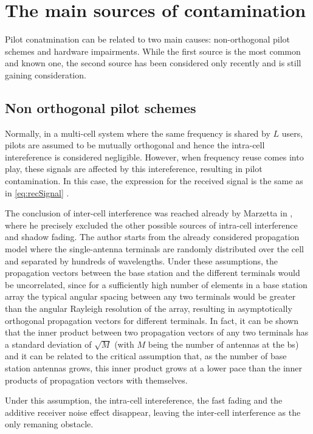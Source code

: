 \documentclass[11pt]{book}
\begin{document}
\section{The main sources of contamination}
Pilot conatmination can be related to two main causes: non-orthogonal pilot schemes and hardware impairments.
While the first source is the most common and known one, the second source has been considered only recently and is still gaining consideration.

\subsection{Non orthogonal pilot schemes}
Normally, in a multi-cell system where the same frequency is shared by $L$ users, pilots are assumed to be mutually orthogonal and hence the intra-cell intereference is considered negligible. However, when frequency reuse comes into play, these signals are affected by this intereference, resulting in pilot contamination. In this case, the expression for the received signal is the same as in \ref{eq:recSignal} \cite{Elijah2016}.

The conclusion of inter-cell interference was reached already by Marzetta in \cite{Marzetta2010}, where he precisely excluded the other possible sources of intra-cell interference and shadow fading. The author starts from the already considered propagation model where the single-antenna terminals are randomly distributed over the cell and separated by hundreds of wavelengths. Under these assumptions, the propagation vectors between the base station and the different terminals would be uncorrelated, since for a sufficiently high number of elements in a base station array the typical angular spacing between any two terminals would be greater than the angular Rayleigh resolution of the array, resulting in asymptotically orthogonal propagation vectors for different terminals. In fact, it can be shown that the inner product between two propagation vectors of any two terminals has a standard deviation of $\sqrt{M}$ (with $M$ being the number of antennas at the \gls{bs}) and it can be related to the critical assumption that, as the number of base station antennas grows, this inner product grows at a lower pace than the inner products of propagation vectors with themselves.

Under this assumption, the intra-cell intereference, the fast fading and the additive receiver noise effect disappear, leaving the inter-cell interference as the only remaning obstacle.
\end{document}
